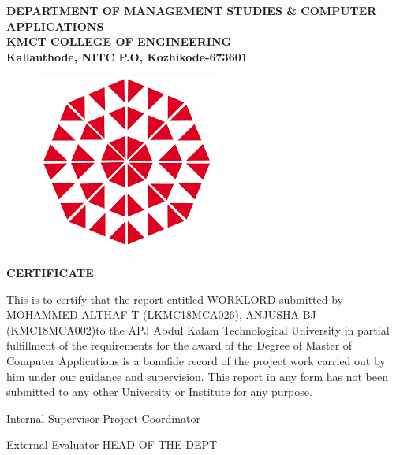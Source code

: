 \documentclass[a4paper,12pt]{report}
\begin{document}
\begin{center}
	
\textbf{
\vspace*{8pt}
DEPARTMENT OF MANAGEMENT STUDIES \& COMPUTER
\vspace*{8pt}
APPLICATIONS\\
KMCT COLLEGE OF ENGINEERING\\
\vspace*{8pt}
Kallanthode, NITC P.O, Kozhikode-673601
}

\begin{figure}[bph]
	\centering
	\includegraphics[width=0.3023\linewidth]{kmct}
	\label{fig:ksblogo}
\end{figure}
\end{center}

{\centering \bf \large
	CERTIFICATE\par
}
\vspace*{10pt}
This is to certify that the report entitled WORKLORD submitted
by MOHAMMED ALTHAF T (LKMC18MCA026), ANJUSHA BJ
(KMC18MCA002)to the APJ Abdul Kalam Technological University
in partial fulfillment of the requirements for the award of the Degree of Master of Computer
Applications is a bonafide record of the project work carried out by him under our guidance and
supervision. This report in any form has not been submitted to any other University or Institute for
any purpose.

\begin{center}
	\vspace*{100pt}Internal Supervisor \hspace*{150pt} Project Coordinator
\end{center}

\begin{center}\vspace*{40pt}
\hspace*{1pt}	External Evaluator \hspace*{140pt} HEAD OF THE DEPT
\end{center}
	
\pagebreak
\tableofcontents{}
\pagebreak
\end{document}
